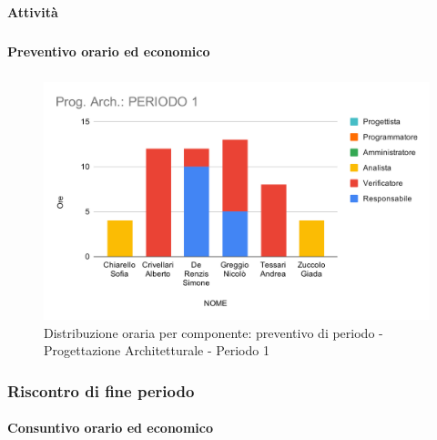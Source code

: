 \paragraph{Attività}
\subparagraph*{}

\planningTable{
	
}

\paragraph{Preventivo orario ed economico}
\subparagraph*{}

\contabilitaTable{
	
}

\begin{figure}[H]
	\centering
	\includegraphics[scale=2]{res/images/charts/preventivo/prog_arch_1.png}
	\caption{Distribuzione oraria per componente: preventivo di periodo - Progettazione Architetturale - Periodo 1}
\end{figure}


\subsubsection{Riscontro di fine periodo}


\paragraph{Consuntivo orario ed economico}
\subparagraph*{}

\contabilitaTable{
	
}

